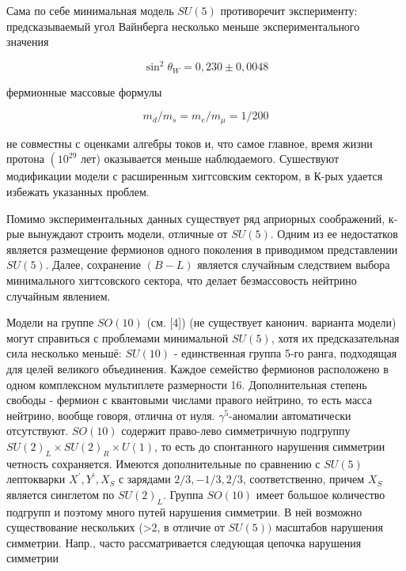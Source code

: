 \documentclass[10pt]{article}
\begin{document}
Сама по себе минимальная модель $S U(5)$ противоречит эксперименту: предсказываемый угол Вайнберга несколько меньше экспериментального значения



\[

\sin ^{2} \theta_{W}=0,230 \pm 0,0048

\]



фермионные массовые формулы



\[

m_{d} / m_{s}=m_{e} / m_{\mu}=1 / 200

\]



не совместны с оценками алгебры токов и, что самое главное, время жизни протона $\left(10^{29}\right.$ лет) оказывается меньше наблюдаемого. Сушествуют модификации модели с расширенным хиггсовским сектором, в К-рых удается избежать указанных проблем.



Помимо экспериментальных данных существует ряд априорных соображений, к-рые вынуждают строить модели, отличные от $S U(5)$. Одним из ее недостатков является размещение фермионов одного поколения в приводимом представлении $S U(5)$. Далее, сохранение $(B-L)$ является случайным следствием выбора минимального хигтсовского сектора, что делает безмассовость нейтрино случайным явлением.



Модели на группе $S O(10)$ (см. [4]) (не существует канонич. варианта модели) могут справиться с проблемами минимальной $S U(5)$, хотя их предсказательная сила несколько меньшё: $S U(10)$ - единственная группа 5-го ранга, подходящая для целей великого объединения. Каждое семейство фермионов расположено в одном комплексном мультиплете размерности 16. Дополнительная степень свободы - фермион с квантовыми числами правого нейтрино, то есть масса нейтрино, вообще говоря, отлична от нуля. $\gamma^{5}$-аномалии автоматически отсутствуют. $S O(10)$ содержит право-лево симметричную подгруппу $S U(2)_{L} \times S U(2)_{R} \times U(1)$, то есть до спонтанного нарушения симметрии четность сохраняется. Имеются дополнительные по сравнению с $S U(5)$ лептокварки $X^{\prime}, Y^{\prime}, X_{S}$ с зарядами $2 / 3,-1 / 3,2 / 3$, соответственно, причем $X_{S}$ является синглетом по $S U(2)_{L}$. Группа $S O(10)$ имеет большое количество подгрупп и поэтому много путей нарушения симметрии. В ней возможно существование нескольких (>2, в отличие от $S U(5))$ масштабов нарушения симметрии. Напр., часто рассматривается следующая цепочка нарушения симметрии
\end{document}
